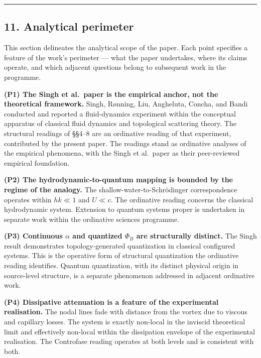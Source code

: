 \documentclass[
  11pt,
  a4paper,
]{article}
\begin{document}
\begin{center}\rule{0.5\linewidth}{0.5pt}\end{center}

\subsection{11. Analytical perimeter}\label{analytical-perimeter}

This section delineates the analytical scope of the paper. Each point
specifies a feature of the work's perimeter --- what the paper
undertakes, where its claims operate, and which adjacent questions
belong to subsequent work in the programme.

\textbf{(P1) The Singh et al.~paper is the empirical anchor, not the
theoretical framework.} Singh, Rønning, Liu, Angheluta, Concha, and
Bandi conducted and reported a fluid-dynamics experiment within the
conceptual apparatus of classical fluid dynamics and topological
scattering theory. The structural readings of §§4--8 are an ordinative
reading of that experiment, contributed by the present paper. The
readings stand as ordinative analyses of the empirical phenomena, with
the Singh et al.~paper as their peer-reviewed empirical foundation.

\textbf{(P2) The hydrodynamic-to-quantum mapping is bounded by the
regime of the analogy.} The shallow-water-to-Schrödinger correspondence
operates within \(hk \ll 1\) and \(U \ll c\). The ordinative reading
concerns the classical hydrodynamic system. Extension to quantum systems
proper is undertaken in separate work within the ordinative sciences
programme.

\textbf{(P3) Continuous \(\alpha\) and quantized \(\Phi_B\) are
structurally distinct.} The Singh result demonstrates topology-generated
quantization in classical configured systems. This is the operative form
of structural quantization the ordinative reading identifies. Quantum
quantization, with its distinct physical origin in source-level
structure, is a separate phenomenon addressed in adjacent ordinative
work.

\textbf{(P4) Dissipative attenuation is a feature of the experimental
realisation.} The nodal lines fade with distance from the vortex due to
viscous and capillary losses. The system is exactly non-local in the
inviscid theoretical limit and effectively non-local within the
dissipation envelope of the experimental realisation. The Controfase
reading operates at both levels and is consistent with both.
\end{document}
